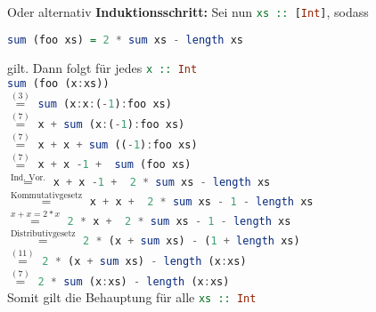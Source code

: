 \documentclass{scrreprt}
\begin{document}
Oder alternativ \textbf{Induktionsschritt:} Sei nun \lstinline[language=Haskell]{xs :: [Int]},
sodass
\begin{lstlisting}[language=Haskell]
  sum (foo xs) = 2 * sum xs - length xs
\end{lstlisting}
gilt.
Dann folgt für jedes \lstinline[language=Haskell]{x :: Int} \\
\lstinline[language=Haskell]{sum (foo (x:xs))} \\
$\overset{(3)}=$ \lstinline[language=Haskell]{sum (x:x:(-1):foo xs)} \\
$\overset{(7)}=$ \lstinline[language=Haskell]{x + sum (x:(-1):foo xs)} \\
$\overset{(7)}=$ \lstinline[language=Haskell]{x + x + sum ((-1):foo xs)} \\
$\overset{(7)}=$ \lstinline[language=Haskell]{x + x -1 +  sum (foo xs)} \\
$\overset{\text{Ind. Vor.}}=$
\lstinline[language=Haskell]{x + x -1 +  2 * sum xs - length xs} \\
$\overset{\text{Kommutativgesetz}}=$
\lstinline[language=Haskell]{x + x +  2 * sum xs - 1 - length xs} \\
$\overset{x + x = 2 * x}=$
\lstinline[language=Haskell]{2 * x +  2 * sum xs - 1 - length xs} \\
$\overset{\text{Distributivgesetz}}=$
\lstinline[language=Haskell]{2 * (x + sum xs) - (1 + length xs)} \\
$\overset{(11)}=$
\lstinline[language=Haskell]{2 * (x + sum xs) - length (x:xs)} \\
$\overset{(7)}=$
\lstinline[language=Haskell]{2 * sum (x:xs) - length (x:xs)} \\

Somit gilt die Behauptung für alle \lstinline[language=Haskell]{xs :: Int}
\end{document}
